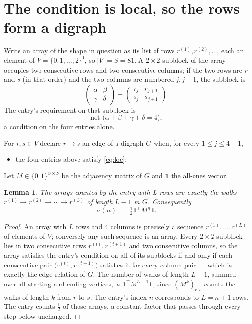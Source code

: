 \documentclass[11pt,a4paper]{article}
\theoremstyle{plain}
\newtheorem{lemma}[theorem]{Lemma}
\theoremstyle{definition}
\begin{document}
\section{The condition is local, so the rows form a digraph}

Write an array of the shape in question as its list of rows
$r^{(1)},r^{(2)},\dots$, each an element of
$V=\{0,1,\dots,2\}^{4}$, so $|V|=S=81$. A $2\times2$ subblock of the array
occupies two consecutive rows and two consecutive columns; if the two rows are $r$
and $s$ (in that order) and the two columns are numbered $j,j+1$,
the subblock is
\[
\begin{pmatrix}\alpha&\beta\\\gamma&\delta\end{pmatrix}=\begin{pmatrix}r_j&r_{j+1}\\s_j&s_{j+1}\end{pmatrix}.
\]
The entry's requirement on that subblock is
\begin{equation}\label{eq:loc}
\text{not }\bigl(\alpha+\beta+\gamma+\delta=4\bigr),
\end{equation}
a condition on the four entries alone.

For $r,s\in V$ declare $r\to s$ an edge of a digraph $G$ when, for every
$1\le j\le 4-1$,
\begin{itemize}
\item the four entries above satisfy \eqref{eq:loc};

\end{itemize}
Let $M\in\{0,1\}^{S\times S}$ be the adjacency matrix of $G$ and $\mathbf{1}$ the
all-ones vector.

\begin{lemma}\label{lem:walk}
The arrays counted by the entry with $L$ rows are exactly the walks
$r^{(1)}\to r^{(2)}\to\cdots\to r^{(L)}$ of length $L-1$ in $G$. Consequently
\[
a(n)\;=\;\tfrac1{2}\mathbf{1}^{\!\top}M^{n}\mathbf{1} .
\]
\end{lemma}

\begin{proof}
An array with $L$ rows and $4$ columns is precisely a sequence
$r^{(1)},\dots,r^{(L)}$ of elements of $V$; conversely any such sequence is an array.
Every $2\times2$ subblock lies in two consecutive rows $r^{(t)},r^{(t+1)}$ and two
consecutive columns, so the array satisfies the entry's condition on all of its subblocks
if and only if each consecutive pair $\bigl(r^{(t)},r^{(t+1)}\bigr)$ satisfies it for
every column pair --- which is exactly the edge relation of $G$. The number of walks of
length $L-1$, summed over all starting and ending vertices, is
$\mathbf{1}^{\!\top}M^{L-1}\mathbf{1}$, since $(M^{k})_{r,s}$ counts the walks of
length $k$ from $r$ to $s$. The entry's index $n$ corresponds to $L=n+1$ rows. The entry counts $\tfrac1{2}$ of those arrays, a constant factor that passes through every step below unchanged.
\end{proof}
\end{document}

